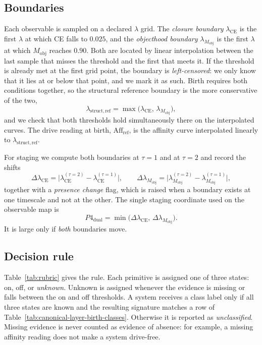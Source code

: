 \subsection{Boundaries}

Each observable is sampled on a declared $\lambda$ grid. The \emph{closure boundary} $\lambda_{\mathrm{CE}}$ is the first $\lambda$ at which CE falls to $0.025$, and the \emph{objecthood boundary} $\lambda_{M_{\mathrm{obj}}}$ is the first $\lambda$ at which $M_{\mathrm{obj}}$ reaches $0.90$. Both are located by linear interpolation between the last sample that misses the threshold and the first that meets it. If the threshold is already met at the first grid point, the boundary is \emph{left-censored}: we only know that it lies at or below that point, and we mark it as such. Birth requires both conditions together, so the structural reference boundary is the more conservative of the two,
\[
\lambda_{\mathrm{struct,ref}}=\max\bigl(\lambda_{\mathrm{CE}},\,\lambda_{M_{\mathrm{obj}}}\bigr),
\]
and we check that both thresholds hold simultaneously there on the interpolated curves. The drive reading at birth, $\mathrm{Aff}_{\mathrm{ref}}$, is the affinity curve interpolated linearly to $\lambda_{\mathrm{struct,ref}}$.

For staging we compute both boundaries at $\tau=1$ and at $\tau=2$ and record the shifts
\[
\Delta\lambda_{\mathrm{CE}}=\bigl|\lambda_{\mathrm{CE}}^{(\tau=2)}-\lambda_{\mathrm{CE}}^{(\tau=1)}\bigr|,\qquad
\Delta\lambda_{M_{\mathrm{obj}}}=\bigl|\lambda_{M_{\mathrm{obj}}}^{(\tau=2)}-\lambda_{M_{\mathrm{obj}}}^{(\tau=1)}\bigr|,
\]
together with a \emph{presence change} flag, which is raised when a boundary exists at one timescale and not at the other. The single staging coordinate used on the observable map is
\[
P4_{\mathrm{dual}}=\min\bigl(\Delta\lambda_{\mathrm{CE}},\,\Delta\lambda_{M_{\mathrm{obj}}}\bigr).
\]
It is large only if \emph{both} boundaries move.

\subsection{Decision rule}

Table~\ref{tab:rubric} gives the rule. Each primitive is assigned one of three states: on, off, or \emph{unknown}. Unknown is assigned whenever the evidence is missing or falls between the on and off thresholds. A system receives a class label only if all three states are known and the resulting signature matches a row of Table~\ref{tab:canonical-layer-birth-classes}. Otherwise it is reported as \emph{unclassified}. Missing evidence is never counted as evidence of absence: for example, a missing affinity reading does not make a system drive-free.

